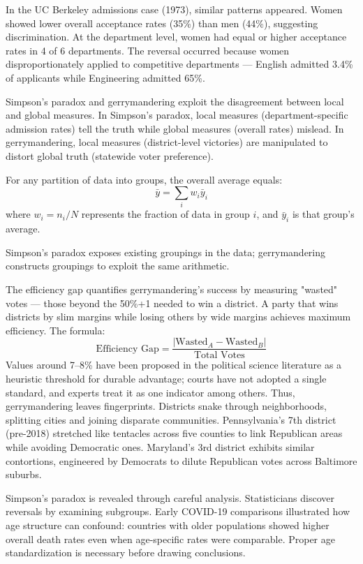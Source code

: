 \vspace{1em}

In the UC Berkeley admissions case (1973), similar patterns appeared. Women showed lower overall acceptance rates (35\%) than men (44\%), suggesting discrimination. At the department level, women had equal or higher acceptance rates in 4 of 6 departments. The reversal occurred because women disproportionately applied to competitive departments — English admitted 3.4\% of applicants while Engineering admitted 65\%. 

Simpson’s paradox and gerrymandering exploit the disagreement between local and global measures. In Simpson's paradox, local measures (department-specific admission rates) tell the truth while global measures (overall rates) mislead. In gerrymandering, local measures (district-level victories) are manipulated to distort global truth (statewide voter preference).

For any partition of data into groups, the overall average equals:
\[
\bar{y} = \sum_{i} w_i \bar{y}_i
\]
where $w_i = n_i/N$ represents the fraction of data in group $i$, and $\bar{y}_i$ is that group's average.

Simpson’s paradox exposes existing groupings in the data; gerrymandering constructs groupings to exploit the same arithmetic.

The efficiency gap quantifies gerrymandering's success by measuring "wasted" votes — those beyond the 50\%+1 needed to win a district. A party that wins districts by slim margins while losing others by wide margins achieves maximum efficiency. The formula:
\[
\text{Efficiency Gap} = \frac{|\text{Wasted}_A - \text{Wasted}_B|}{\text{Total Votes}}
\]
Values around 7–8\% have been proposed in the political science literature as a heuristic threshold for durable advantage; courts have not adopted a single standard, and experts treat it as one indicator among others. Thus, gerrymandering leaves fingerprints. Districts snake through neighborhoods, splitting cities and joining disparate communities. Pennsylvania's 7th district (pre-2018) stretched like tentacles across five counties to link Republican areas while avoiding Democratic ones. Maryland's 3rd district exhibits similar contortions, engineered by Democrats to dilute Republican votes across Baltimore suburbs. 

Simpson's paradox is revealed through careful analysis. Statisticians discover reversals by examining subgroups. Early COVID-19 comparisons illustrated how age structure can confound: countries with older populations showed higher overall death rates even when age-specific rates were comparable. Proper age standardization is necessary before drawing conclusions.

